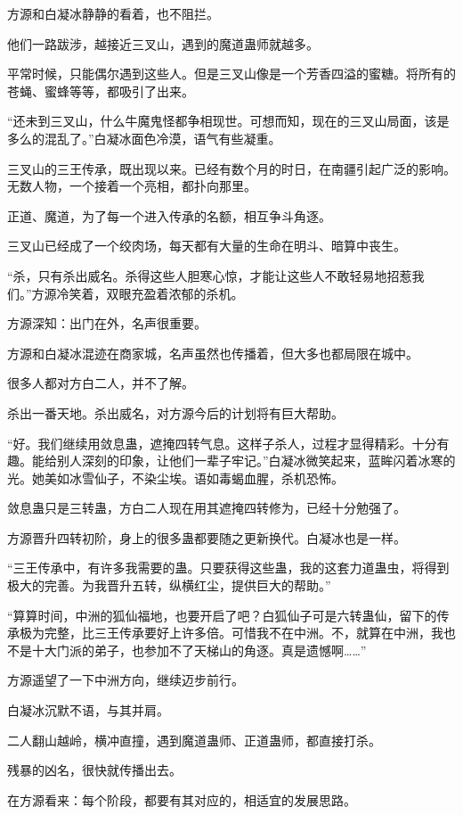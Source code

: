 \begin{this_body}
方源和白凝冰静静的看着，也不阻拦。

他们一路跋涉，越接近三叉山，遇到的魔道蛊师就越多。

平常时候，只能偶尔遇到这些人。但是三叉山像是一个芳香四溢的蜜糖。将所有的苍蝇、蜜蜂等等，都吸引了出来。

“还未到三叉山，什么牛魔鬼怪都争相现世。可想而知，现在的三叉山局面，该是多么的混乱了。”白凝冰面色冷漠，语气有些凝重。

三叉山的三王传承，既出现以来。已经有数个月的时日，在南疆引起广泛的影响。无数人物，一个接着一个亮相，都扑向那里。

正道、魔道，为了每一个进入传承的名额，相互争斗角逐。

三叉山已经成了一个绞肉场，每天都有大量的生命在明斗、暗算中丧生。

“杀，只有杀出威名。杀得这些人胆寒心惊，才能让这些人不敢轻易地招惹我们。”方源冷笑着，双眼充盈着浓郁的杀机。

方源深知：出门在外，名声很重要。

方源和白凝冰混迹在商家城，名声虽然也传播着，但大多也都局限在城中。

很多人都对方白二人，并不了解。

杀出一番天地。杀出威名，对方源今后的计划将有巨大帮助。

“好。我们继续用敛息蛊，遮掩四转气息。这样子杀人，过程才显得精彩。十分有趣。能给别人深刻的印象，让他们一辈子牢记。”白凝冰微笑起来，蓝眸闪着冰寒的光。她美如冰雪仙子，不染尘埃。语如毒蝎血腥，杀机恐怖。

敛息蛊只是三转蛊，方白二人现在用其遮掩四转修为，已经十分勉强了。

方源晋升四转初阶，身上的很多蛊都要随之更新换代。白凝冰也是一样。

“三王传承中，有许多我需要的蛊。只要获得这些蛊，我的这套力道蛊虫，将得到极大的完善。为我晋升五转，纵横红尘，提供巨大的帮助。”

“算算时间，中洲的狐仙福地，也要开启了吧？白狐仙子可是六转蛊仙，留下的传承极为完整，比三王传承要好上许多倍。可惜我不在中洲。不，就算在中洲，我也不是十大门派的弟子，也参加不了天梯山的角逐。真是遗憾啊……”

方源遥望了一下中洲方向，继续迈步前行。

白凝冰沉默不语，与其并肩。

二人翻山越岭，横冲直撞，遇到魔道蛊师、正道蛊师，都直接打杀。

残暴的凶名，很快就传播出去。

在方源看来：每个阶段，都要有其对应的，相适宜的发展思路。


\end{this_body}
